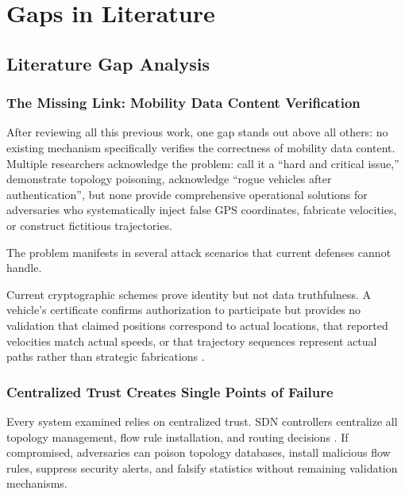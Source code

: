 \documentclass[12pt, a4paper]{report}
\begin{document}
\newpage
\section{Gaps in Literature}
\label{sec:gaps-literature}

\subsection{Literature Gap Analysis}
\label{subsec:gap-analysis}

\subsubsection{The Missing Link: Mobility Data Content Verification}
\label{subsec:missing-link}

After reviewing all this previous work, one gap stands out above all others: no existing mechanism specifically verifies the correctness of mobility data content. Multiple researchers acknowledge the problem: \cite{arif2020} call it a ``hard and critical issue,'' \cite{hong2015} demonstrate topology poisoning, \cite{raja2021} acknowledge ``rogue vehicles after authentication'', but none provide comprehensive operational solutions for adversaries who systematically inject false GPS coordinates, fabricate velocities, or construct fictitious trajectories.

The problem manifests in several attack scenarios that current defenses cannot handle.

Current cryptographic schemes prove identity but not data truthfulness. A vehicle's certificate confirms authorization to participate but provides no validation that claimed positions correspond to actual locations, that reported velocities match actual speeds, or that trajectory sequences represent actual paths rather than strategic fabrications \cite{arif2020}.

\subsubsection{Centralized Trust Creates Single Points of Failure}
\label{subsec:centralized-trust}

Every system examined relies on centralized trust. SDN controllers centralize all topology management, flow rule installation, and routing decisions \cite{bhatia2019}. If compromised, adversaries can poison topology databases, install malicious flow rules, suppress security alerts, and falsify statistics without remaining validation mechanisms.
\end{document}
